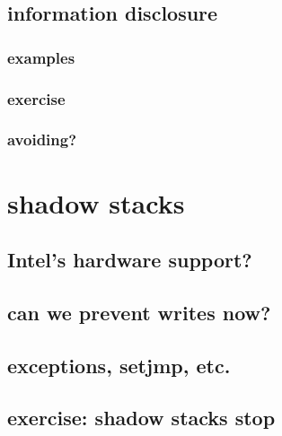 

\subsection{information disclosure}
\subsubsection{examples}




\subsubsection{exercise}


\subsubsection{avoiding?}


\section{shadow stacks}


\subsection{Intel's hardware support?}


\subsection{can we prevent writes now?}


\subsection{exceptions, setjmp, etc.}


\subsection{exercise: shadow stacks stop}


